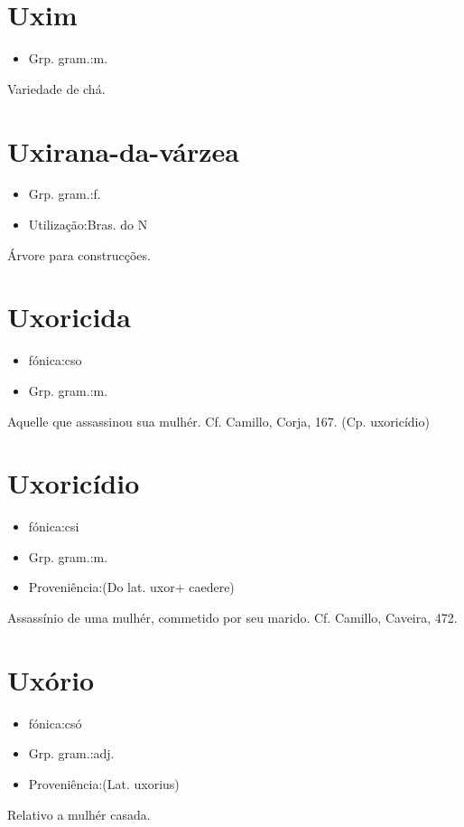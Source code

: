 \documentclass{article}
\begin{document}
\section{Uxim}
\begin{itemize}
\item {Grp. gram.:m.}
\end{itemize}
Variedade de chá.
\section{Uxirana-da-várzea}
\begin{itemize}
\item {Grp. gram.:f.}
\end{itemize}
\begin{itemize}
\item {Utilização:Bras. do N}
\end{itemize}
Árvore para construcções.
\section{Uxoricida}
\begin{itemize}
\item {fónica:cso}
\end{itemize}
\begin{itemize}
\item {Grp. gram.:m.}
\end{itemize}
Aquelle que assassinou sua mulhér. Cf. Camillo, \textunderscore Corja\textunderscore , 167.
(Cp. \textunderscore uxoricídio\textunderscore )
\section{Uxoricídio}
\begin{itemize}
\item {fónica:csi}
\end{itemize}
\begin{itemize}
\item {Grp. gram.:m.}
\end{itemize}
\begin{itemize}
\item {Proveniência:(Do lat. \textunderscore uxor\textunderscore  + \textunderscore caedere\textunderscore )}
\end{itemize}
Assassínio de uma mulhér, commetido por seu marido. Cf. Camillo, \textunderscore Caveira\textunderscore , 472.
\section{Uxório}
\begin{itemize}
\item {fónica:csó}
\end{itemize}
\begin{itemize}
\item {Grp. gram.:adj.}
\end{itemize}
\begin{itemize}
\item {Proveniência:(Lat. \textunderscore uxorius\textunderscore )}
\end{itemize}
Relativo a mulhér casada.
\end{document}
